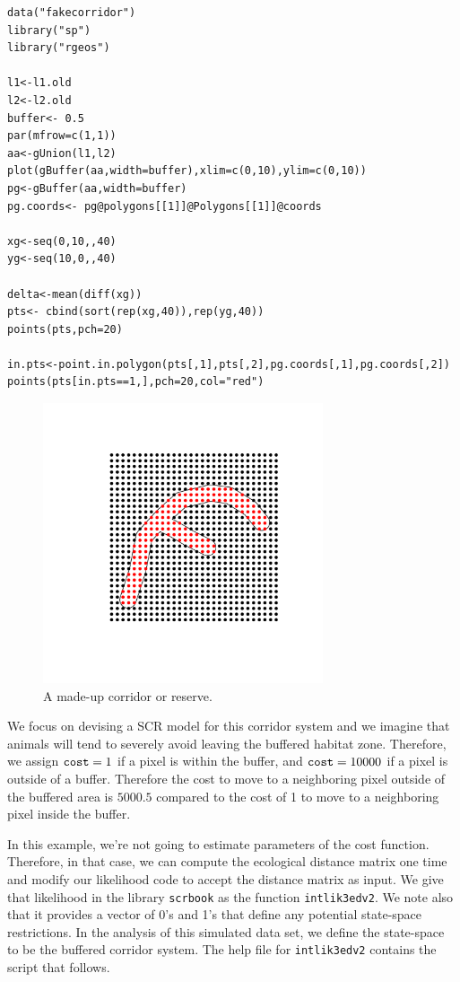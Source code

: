 {\small
\begin{verbatim}
data("fakecorridor")
library("sp")
library("rgeos")

l1<-l1.old
l2<-l2.old
buffer<- 0.5
par(mfrow=c(1,1))
aa<-gUnion(l1,l2)
plot(gBuffer(aa,width=buffer),xlim=c(0,10),ylim=c(0,10))
pg<-gBuffer(aa,width=buffer)
pg.coords<- pg@polygons[[1]]@Polygons[[1]]@coords

xg<-seq(0,10,,40)
yg<-seq(10,0,,40)

delta<-mean(diff(xg))
pts<- cbind(sort(rep(xg,40)),rep(yg,40))
points(pts,pch=20)

in.pts<-point.in.polygon(pts[,1],pts[,2],pg.coords[,1],pg.coords[,2])
points(pts[in.pts==1,],pch=20,col="red")
\end{verbatim}
}


\begin{figure}
\begin{center}
\includegraphics[height=3.25in,width=3.25in]{Ch10/figs/corridor}
\end{center}
\caption{A made-up corridor or reserve.}
\label{ecoldist.fig.corridor}
\end{figure}


We focus on devising a SCR model for this corridor system and we
imagine that animals will tend to severely avoid leaving the buffered
habitat zone. Therefore, we assign $\mbox{\tt cost}=1$ if a pixel is within the
buffer,
and $\mbox{\tt cost} = 10000$ if a pixel is outside of a
buffer. Therefore the cost to move to a neighboring pixel outside of
the buffered area is $5000.5$ compared to the cost of 1 to move to a
neighboring pixel inside the buffer. 

In this example, we're not going to estimate parameters of the cost
function. Therefore, in that case, we can compute the ecological
distance matrix one time and modify our likelihood code to accept the
distance matrix as input. We give that likelihood in the library
\mbox{\tt scrbook} as the function \mbox{\tt intlik3edv2}.
We note also that it provides a vector of 0's and 1's that
define any potential state-space restrictions. In the analysis of this
simulated data set, we define the state-space to be the buffered
corridor system. The help file for \mbox{\tt intlik3edv2} contains the
script that follows.

